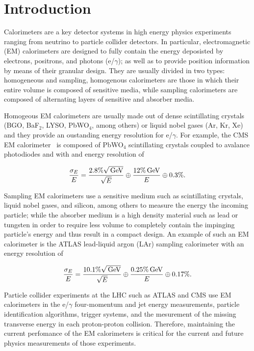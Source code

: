 \section{Introduction}
Calorimeters are a key detector systems in high energy physics experiments
ranging from neutrino to particle collider detectors. In
particular, electromagnetic (EM) calorimeters are designed to fully
contain the energy deposisted by electrons, positrons, and photons (e/$\gamma$);
as well as to provide position information by means of their granular
design. They are usually divided in two types: homogeneous and
sampling, homogenous calorimeters are those in which their entire
volume is composed of sensitive media, while sampling calorimeters
are composed of alternating layers of sensitive and absorber
media. 

Homogeous EM calorimeters are usually made out of dense scintillating
crystals (BGO, BaF$_{2}$, LYSO, PbWO$_{4}$, among others) or liquid nobel gases
(Ar, Kr, Xe) and they provide an oustanding energy resolution for
e/$\gamma$. For example, the CMS EM calorimeter~\cite{cmsECAL} is
composed of PbWO$_{4}$ scintillating crystals coupled to avalance
photodiodes and with and energy resolution of

\begin{equation}
\frac{\sigma_{E}}{E} = \frac{2.8\%\sqrt{\,\text{Ge\hspace{-.08em}V}}}{\sqrt{E}} \oplus \frac{12\%\,\text{Ge\hspace{-.08em}V}}{E} \oplus 0.3\%.
\end{equation}

Sampling EM calorimeters use a sensitive medium such as
scintillating crystals, liquid nobel gases, and silicon, among others
to measure the energy the incoming particle;
while the absorber medium is a high density material such as lead or
tungsten in order to require less volume to completely contain the
impinging particle's energy and thus result in a compact design. An
example of such an EM calorimeter is the ATLAS lead-liquid argon (LAr)
sampling calorimeter with an energy resolution of

\begin{equation}
\frac{\sigma_{E}}{E} = \frac{10.1\%\sqrt{\,\text{Ge\hspace{-.08em}V}}}{\sqrt{E}} \oplus \frac{0.25\%\,\text{Ge\hspace{-.08em}V}}{E} \oplus 0.17\%.
\end{equation}

Particle collider experiments at the LHC such as ATLAS and CMS
use EM calorimeters in the e/$\gamma$ four-momentum and jet
energy measurements, particle identification algorithms,
trigger systems, and the mesurement of the missing transverse energy in
each proton-proton collision. Therefore, maintaining the current perfomance of the EM
calorimeters is critical for the current and future physics measurements of those experiments.

